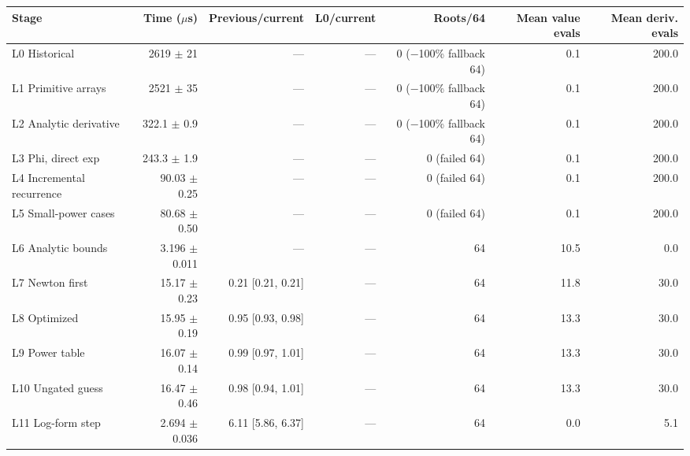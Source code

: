 \begin{tabular}{lrrrrrr}
\toprule
Stage & Time ($\mu$s) & Previous/current & L0/current & Roots/64 & Mean value evals & Mean deriv. evals \\
\midrule
L0 Historical & 2619 $\pm$ 21 & --- & --- & 0 ($-$100\% fallback 64) & 0.1 & 200.0 \\
L1 Primitive arrays & 2521 $\pm$ 35 & --- & --- & 0 ($-$100\% fallback 64) & 0.1 & 200.0 \\
L2 Analytic derivative & 322.1 $\pm$ 0.9 & --- & --- & 0 ($-$100\% fallback 64) & 0.1 & 200.0 \\
L3 Phi, direct exp & 243.3 $\pm$ 1.9 & --- & --- & 0 (failed 64) & 0.1 & 200.0 \\
L4 Incremental recurrence & 90.03 $\pm$ 0.25 & --- & --- & 0 (failed 64) & 0.1 & 200.0 \\
L5 Small-power cases & 80.68 $\pm$ 0.50 & --- & --- & 0 (failed 64) & 0.1 & 200.0 \\
L6 Analytic bounds & 3.196 $\pm$ 0.011 & --- & --- & 64 & 10.5 & 0.0 \\
L7 Newton first & 15.17 $\pm$ 0.23 & 0.21 [0.21, 0.21] & --- & 64 & 11.8 & 30.0 \\
L8 Optimized & 15.95 $\pm$ 0.19 & 0.95 [0.93, 0.98] & --- & 64 & 13.3 & 30.0 \\
L9 Power table & 16.07 $\pm$ 0.14 & 0.99 [0.97, 1.01] & --- & 64 & 13.3 & 30.0 \\
L10 Ungated guess & 16.47 $\pm$ 0.46 & 0.98 [0.94, 1.01] & --- & 64 & 13.3 & 30.0 \\
L11 Log-form step & 2.694 $\pm$ 0.036 & 6.11 [5.86, 6.37] & --- & 64 & 0.0 & 5.1 \\
\bottomrule
\end{tabular}
